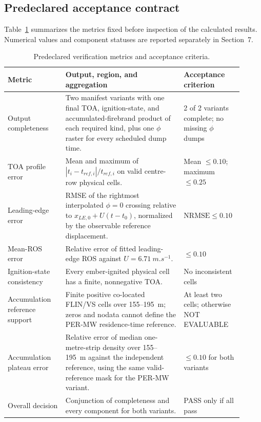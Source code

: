 \subsection{Predeclared acceptance contract}

Table~\ref{tab:acceptance-contract} summarizes the metrics fixed before
inspection of the calculated results. Numerical values and component statuses
are reported separately in Section~7.

\begin{table}[H]
\centering
\footnotesize
\caption{Predeclared verification metrics and acceptance criteria.}
\label{tab:acceptance-contract}
\begin{tabular}{@{}p{0.23\linewidth}p{0.47\linewidth}p{0.21\linewidth}@{}}
\toprule
Metric & Output, region, and aggregation & Acceptance criterion\\
\midrule
Output completeness & Two manifest variants with one final TOA, ignition-state, and accumulated-firebrand product of each required kind, plus one $\phi$ raster for every scheduled dump time. & 2 of 2 variants complete; no missing $\phi$ dumps \\
TOA profile error & Mean and maximum of \(|t_i-t_{ref,i}|/t_{ref,i}\) on valid centre-row physical cells. & Mean \(\le0.10\); maximum \(\le0.25\) \\
Leading-edge error & RMSE of the rightmost interpolated $\phi=0$ crossing relative to \(x_{LE,0}+U(t-t_0)\), normalized by the observable reference displacement. & \(\mathrm{NRMSE}\le0.10\) \\
Mean-ROS error & Relative error of fitted leading-edge ROS against \(U=\SI{6.71}{m.s^{-1}}\). & \(\le0.10\) \\
Ignition-state consistency & Every ember-ignited physical cell has a finite, nonnegative TOA. & No inconsistent cells \\
Accumulation reference support & Finite positive co-located FLIN/VS cells over 155--\SI{195}{m}; zeros and nodata cannot define the PER-MW residence-time reference. & At least two cells; otherwise NOT EVALUABLE \\
Accumulation plateau error & Relative error of median one-metre-strip density over 155--\SI{195}{m} against the independent reference, using the same valid-reference mask for the PER-MW variant. & \(\le0.10\) for both variants \\
Overall decision & Conjunction of completeness and every component for both variants. & PASS only if all pass \\
\bottomrule
\end{tabular}
\end{table}

